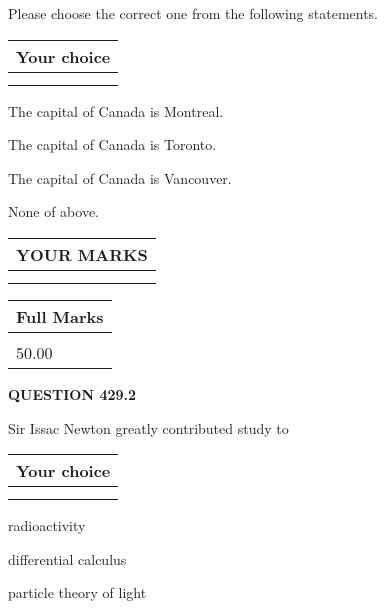 \documentclass[12pt]{article}
\begin{document}
  
Please choose the correct one from the following statements.
  
  
\noindent\hspace{3.0in} \begin{tabular}{|l|}
\hline
Your choice \\
\hline
 \\ 
 \\ 
\hline
\end{tabular}
  
  
 
 
The capital of Canada is Montreal.
 
 
The capital of Canada is Toronto.
 
 
The capital of Canada is Vancouver.
 
 
 None of above.
 
 
  
\vspace{0.2in}
  
\noindent\begin{tabular}{|l|}
\hline
 YOUR MARKS  \\
\hline
 \\ 
 \\ 
\hline
\end{tabular}
\hspace{0.05in} \begin{tabular}{|l|}
\hline
 Full Marks  \\
\hline
 \\ 
50.00 \\
\hline
\end{tabular}
{\textbf{\Large{QUESTION
429.2 
}}}
  
  
Sir Issac Newton greatly contributed study to
  
  
\noindent\hspace{3.0in} \begin{tabular}{|l|}
\hline
Your choice \\
\hline
 \\ 
 \\ 
\hline
\end{tabular}
  
  
 
 
radioactivity
 
 
differential calculus
 
 
particle theory of light
 
\end{document}
